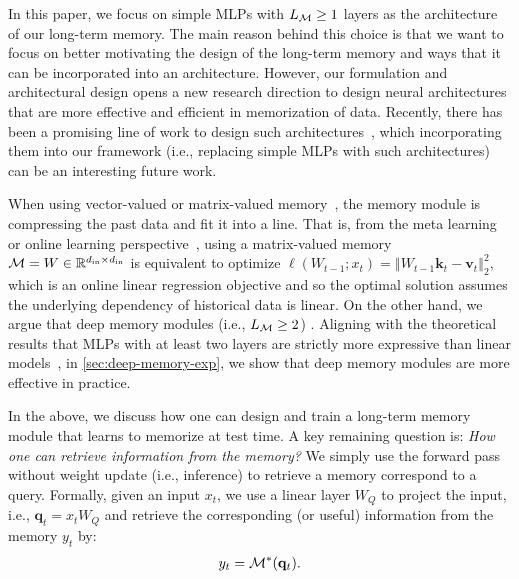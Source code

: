 In this paper, we focus on simple MLPs with $L_{\mathcal{M}} \geq 1$ layers as the architecture of our long-term memory. The main reason behind this choice is that we want to focus on better motivating the design of the long-term memory and ways that it can be incorporated into an architecture.  However, our formulation and architectural design opens a new research direction to design neural architectures that are more effective and efficient in memorization of data. Recently, there has been a promising line of work to design such architectures~\citep{zhang2024memory, cetin2024evolved, berges2024memory}, which incorporating them into our framework (i.e., replacing simple MLPs with such architectures) can be an interesting future work. 


When using vector-valued or matrix-valued memory~\citep{yang2024gatedattn, orvieto2023resurrecting, de2024griffin}, the memory module is compressing the past data and fit it into a line. That is, from the meta learning or online learning perspective~\citep{sun2024learning}, using a matrix-valued memory $\mathcal{M} = W \in \mathbb{R}^{d_{\text{in}} \times d_{\text{in}}}$ is equivalent to optimize $\ell(W_{t-1}; x_t) =\left \Vert W_{t-1}\mathbf{k}_t - \mathbf{v}_t  \right \Vert_2^2$, which is an online linear regression objective and so the optimal solution assumes the underlying dependency of historical data is linear. On the other hand, we argue that deep memory modules (i.e., $L_{\mathcal{M}} \geq 2$) . Aligning with the theoretical results that MLPs with at least two layers are strictly more expressive than linear models~\citep{hornik1989multilayer}, in \autoref{sec:deep-memory-exp}, we show that deep memory modules are more effective in practice.       





In the above, we discuss how one can design and train a long-term memory module that learns to memorize at test time. A key remaining question is: \emph{How one can retrieve information from the memory?} We simply use the forward pass without weight update (i.e., inference) to retrieve a memory correspond to a query. Formally, given an input $x_t$, we use a linear layer $W_{Q}$ to project the input, i.e., $\mathbf{q}_t = x_t W_{Q}$ and retrieve the corresponding (or useful) information from the memory ${y}_t$ by:
\begin{align}
    y_t = \mathcal{M}^*(\mathbf{q}_t).
\end{align}




